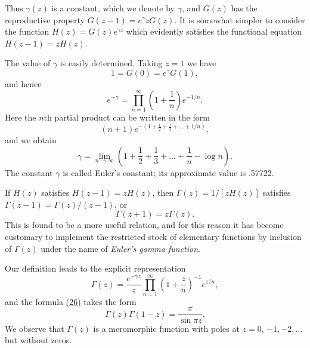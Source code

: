 Thus $\gamma(z)$ is a constant, which we denote by $\gamma$, and $G(z)$ has the reproductive property $G(z - 1) = e^{\gamma}zG(z)$. It is somewhat simpler to consider the function $H(z) = G(z)e^{\gamma z}$ which evidently satisfies the functional equation $H(z - 1) = zH(z)$.

The value of $\gamma$ is easily determined. Taking $z = 1$ we have
\begin{equation*}
1 = G (0) = e ^ {\gamma} G (1),
\end{equation*}
and hence
\begin{equation*}
e ^ {- \gamma} = \prod_ {n = 1} ^ {\infty} \left(1 + \frac {1}{n}\right) e ^ {- 1 / n}.
\end{equation*}
Here the $n$th partial product can be written in the form
\begin{equation*}
(n + 1) e ^ {- (1 + \frac {1}{2} + \frac {1}{3} + \dots + 1 / n)},
\end{equation*}
and we obtain
\begin{equation*}
\gamma = \lim _ {n \rightarrow \infty} \left(1 + \frac {1}{2} + \frac {1}{3} + \dots + \frac {1}{n} - \log n\right).
\end{equation*}
The constant $\gamma$ is called Euler's constant; its approximate value is .57722.

If $H(z)$ satisfies $H(z - 1) = zH(z)$, then $\Gamma(z) = 1 / [zH(z)]$ satisfies $\Gamma(z - 1) = \Gamma(z) / (z - 1)$, or
\begin{equation*}
\Gamma (z + 1) = z \Gamma (z).\tag{28}\label{eq:5.28}
\end{equation*}
This is found to be a more useful relation, and for this reason it has become customary to implement the restricted stock of elementary functions by inclusion of $\Gamma(z)$ under the name of \emph{Euler's gamma function}.

Our definition leads to the explicit representation
\begin{equation*}
\Gamma (z) = \frac {e ^ {- \gamma z}}{z} \prod_ {n = 1} ^ {\infty} \left(1 + \frac {z}{n}\right) ^ {- 1} e ^ {z / n},\tag{29}\label{eq:5.29}
\end{equation*}
and the formula \hyperref[eq:5.26]{(26)} takes the form
\begin{equation*}
\Gamma (z) \Gamma (1 - z) = \frac {\pi}{\sin \pi z}.\tag{30}\label{eq:5.30}
\end{equation*}
We observe that $\Gamma(z)$ is a meromorphic function with poles at $z = 0$, $-1, -2, \ldots$ but without zeros.


